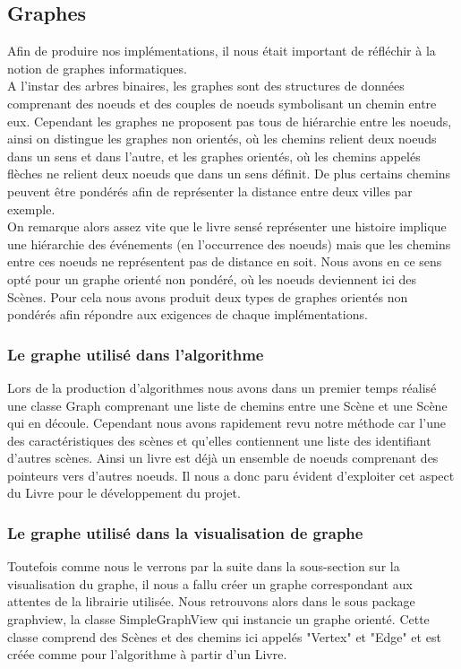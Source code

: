 \documentclass[12pt]{article}
\begin{document}
\subsection{Graphes}
Afin de produire nos implémentations, il nous était important de réfléchir à la notion de graphes informatiques. \\
A l'instar des arbres binaires, les graphes sont des structures de données comprenant des noeuds et des couples de noeuds symbolisant un chemin entre eux. Cependant les graphes ne proposent pas tous de hiérarchie entre les noeuds, ainsi on distingue les graphes non orientés, où les chemins relient deux noeuds dans un sens et dans l'autre, et les graphes orientés, où les chemins appelés flèches ne relient deux noeuds que dans un sens définit. De plus certains chemins peuvent être pondérés afin de représenter la distance entre deux villes par exemple.\\
On remarque alors assez vite que le livre sensé représenter une histoire implique une hiérarchie des événements (en l'occurrence des noeuds) mais que les chemins entre ces noeuds ne représentent pas de distance en soit. Nous avons en ce sens opté pour un graphe orienté non pondéré, où les noeuds deviennent ici des Scènes. Pour cela nous avons produit deux types de graphes orientés non pondérés afin répondre aux exigences de chaque implémentations.

\subsubsection{Le graphe utilisé dans l'algorithme}
Lors de la production d'algorithmes nous avons dans un premier temps réalisé une classe Graph comprenant une liste de chemins entre une Scène et une Scène qui en découle. Cependant nous avons rapidement revu notre méthode car l'une des caractéristiques des scènes et qu'elles contiennent une liste des identifiant d'autres scènes. Ainsi un livre est déjà un ensemble de noeuds comprenant des pointeurs vers d'autres noeuds. Il nous a donc paru évident d'exploiter cet aspect du Livre pour le développement du projet.

\subsubsection{Le graphe utilisé dans la visualisation de graphe}
Toutefois comme nous le verrons par la suite dans la sous-section sur la visualisation du graphe, il nous a fallu créer un graphe correspondant aux attentes de la librairie utilisée. Nous retrouvons alors dans le sous package graphview, la classe SimpleGraphView qui instancie un graphe orienté. Cette classe comprend des Scènes et des chemins ici appelés "Vertex" et "Edge" et est créée comme pour l'algorithme à partir d'un Livre.
\end{document}
